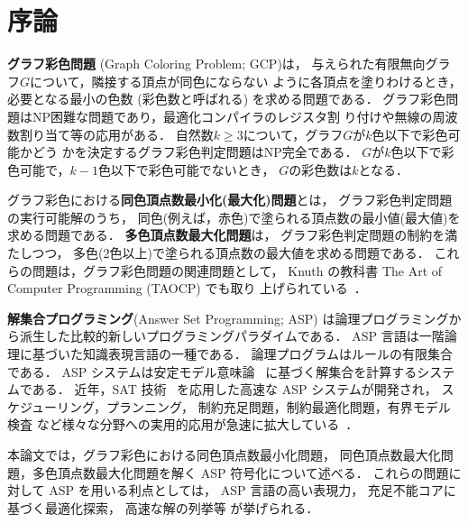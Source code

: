 \chapter{序論}

\textbf{グラフ彩色問題} (Graph Coloring Problem; GCP)は，
与えられた有限無向グラフ$G$について，隣接する頂点が同色にならない
ように各頂点を塗りわけるとき，必要となる最小の色数 (彩色数と呼ばれる)
を求める問題である．
グラフ彩色問題はNP困難な問題であり，最適化コンパイラのレジスタ割
り付けや無線の周波数割り当て等の応用がある．
自然数$k\geq 3$について，グラフ$G$が$k$色以下で彩色可能かどう
かを決定するグラフ彩色判定問題はNP完全である．
$G$が$k$色以下で彩色可能で，$k-1$色以下で彩色可能でないとき，
$G$の彩色数は$k$となる．

グラフ彩色における\textbf{同色頂点数最小化(最大化)問題}とは，
グラフ彩色判定問題の実行可能解のうち，
同色(例えば，赤色)で塗られる頂点数の最小値(最大値)を求める問題である．
\textbf{多色頂点数最大化問題}は，
グラフ彩色判定問題の制約を満たしつつ，
多色(2色以上)で塗られる頂点数の最大値を求める問題である．
これらの問題は，グラフ彩色問題の関連問題として，
Knuth の教科書 The Art of Computer Programming (TAOCP) でも取り
上げられている~\cite{Knuth:TAOCP:SAT}．

\textbf{解集合プログラミング}(Answer Set Programming; ASP\cite{%
  Baral03:cambridge,%
  Gelfond88:iclp,%
  Inoue08:jssst,%
  Niemela99:amai})
は論理プログラミングから派生した比較的新しいプログラミングパラダイムである．
ASP 言語は一階論理に基づいた知識表現言語の一種である．
論理プログラムはルールの有限集合である．
ASP システムは安定モデル意味論~\cite{Gelfond88:iclp}
に基づく解集合を計算するシステムである．
近年，SAT 技術~\cite{JSAI:InoueT10}
を応用した高速な ASP システムが開発され，
スケジューリング，プランニング，
制約充足問題，制約最適化問題，有界モデル検査
など様々な分野への実用的応用が急速に拡大している~\cite{ergele16a,anor/Banbara2019}．

本論文では，グラフ彩色における同色頂点数最小化問題，
同色頂点数最大化問題，多色頂点数最大化問題を解く
ASP 符号化について述べる．
これらの問題に対して ASP を用いる利点としては，
ASP 言語の高い表現力，
充足不能コアに基づく最適化探索，
高速な解の列挙等
が挙げられる．

